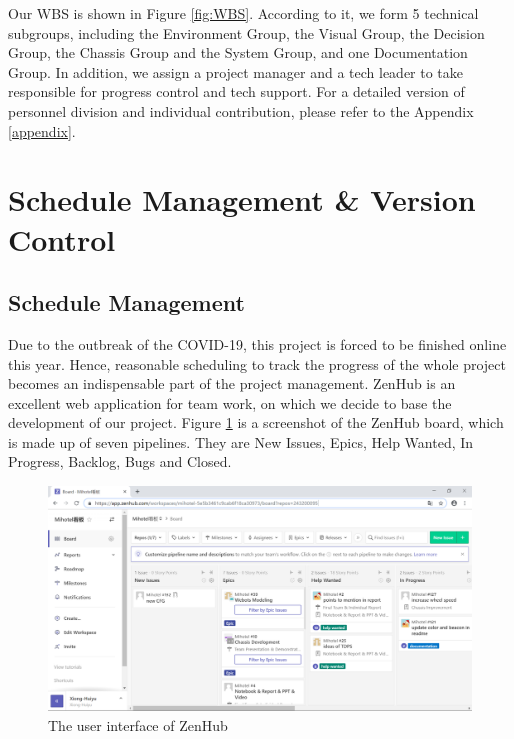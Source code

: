 Our WBS is shown in Figure \ref{fig:WBS}. According to it, we form 5 technical subgroups, including the Environment Group, the Visual Group, the Decision Group, the Chassis Group and the System Group, and one Documentation Group. In addition, we assign a project manager and a tech leader to take responsible for progress control and tech support. For a detailed version of personnel division and individual contribution, please refer to the Appendix \ref{appendix}.
\section{Schedule Management \& Version Control}
\subsection{Schedule Management}
Due to the outbreak of the COVID-19, this project is forced to be finished online this year. Hence, reasonable scheduling to track the progress of the whole project becomes an indispensable part of the project management. ZenHub is an excellent web application for team work, on which we decide to base the development of our project. Figure \ref{fig:ZenHub} is a screenshot of the ZenHub board, which is made up of seven pipelines. They are New Issues, Epics, Help Wanted, In Progress, Backlog, Bugs and Closed. 

\begin{figure}[htbp]
    \centering
    \includegraphics[width=14cm]{management/img_management/ZenHub.png}
    \caption{The user interface of ZenHub}
    \label{fig:ZenHub}
\end{figure}

